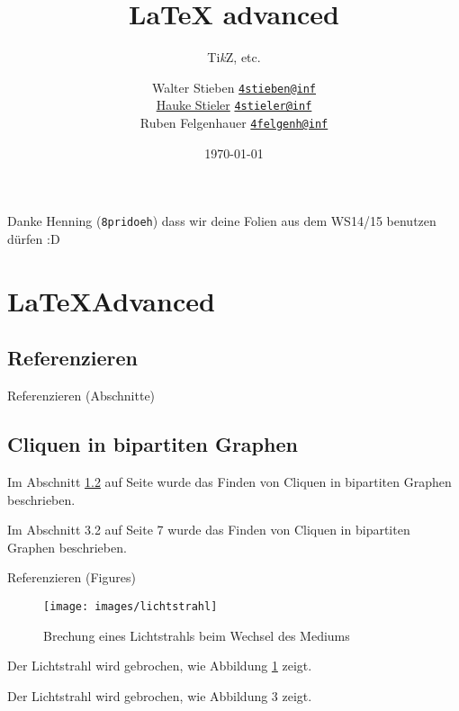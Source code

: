\documentclass{beamer}
\title{\LaTeX{} advanced}
\subtitle{\small Ti\textit{k}Z, etc.}
\author
{
	Walter Stieben \texttt{\href{mailto:4stieben@informatik.uni-hamburg.de}{4stieben@inf}}\\
	\href{http://hauke-stieler.de/}{Hauke Stieler} \texttt{\href{mailto:4stieler@informatik.uni-hamburg.de}{4stieler@inf}}\\
  Ruben Felgenhauer \texttt{\href{mailto:4felgenh@informatik.uni-hamburg.de}{4felgenh@inf}}
}
\date{\footnotesize \today}
\begin{document}
	\maketitle
		
		
	\begin{frame}
		\begin{center}
			Danke Henning (\texttt{8pridoeh}) dass wir deine Folien aus dem WS14/15 benutzen dürfen :D
		\end{center}
	\end{frame}
		
		

		\section{\LaTeX Advanced}
		\subsection{Referenzieren}
		
		
		\begin{frame}[containsverbatim]{Referenzieren (Abschnitte)}
			\begin{latexcode}
\subsection{Cliquen in bipartiten Graphen}
\label{sec:cliques}

Im Abschnitt \ref{sec:cliques} auf Seite
\pageref{sec:cliques} wurde das Finden von
Cliquen in bipartiten Graphen beschrieben.
			\end{latexcode}
			
			\slideheading{Ergebnis:}
			Im Abschnitt 3.2 auf Seite 7 wurde das Finden
			von Cliquen in bipartiten Graphen beschrieben.
		\end{frame}
		
		
		\begin{frame}[containsverbatim]{Referenzieren (Figures)}
			\slideheading{\LaTeX-Code:}
			\begin{latexcode}
\begin{figure}[t]
	\texttt{[image: images/lichtstrahl]}
	\caption{Brechung eines Lichtstrahls beim Wechsel
			 des Mediums}
	\label{fig:lichtbrechung}
\end{figure}
Der Lichtstrahl wird gebrochen, wie
Abbildung \ref{fig:lichtbrechung} zeigt.
			\end{latexcode}
			
			Der Lichtstrahl wird gebrochen, wie Abbildung 3 zeigt.
		\end{frame}
		
\end{document}
